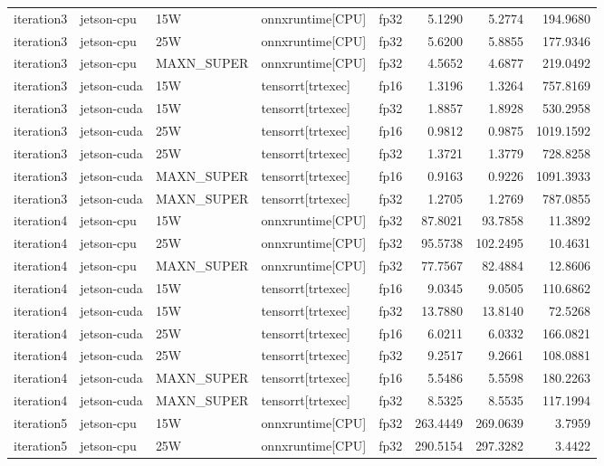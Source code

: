 \begin{table}
\begin{tabular}{lllllrrr}
iteration3 & jetson-cpu & 15W & onnxruntime[CPU] & fp32 & 5.1290 & 5.2774 & 194.9680 \\
iteration3 & jetson-cpu & 25W & onnxruntime[CPU] & fp32 & 5.6200 & 5.8855 & 177.9346 \\
iteration3 & jetson-cpu & MAXN\_SUPER & onnxruntime[CPU] & fp32 & 4.5652 & 4.6877 & 219.0492 \\
iteration3 & jetson-cuda & 15W & tensorrt[trtexec] & fp16 & 1.3196 & 1.3264 & 757.8169 \\
iteration3 & jetson-cuda & 15W & tensorrt[trtexec] & fp32 & 1.8857 & 1.8928 & 530.2958 \\
iteration3 & jetson-cuda & 25W & tensorrt[trtexec] & fp16 & 0.9812 & 0.9875 & 1019.1592 \\
iteration3 & jetson-cuda & 25W & tensorrt[trtexec] & fp32 & 1.3721 & 1.3779 & 728.8258 \\
iteration3 & jetson-cuda & MAXN\_SUPER & tensorrt[trtexec] & fp16 & 0.9163 & 0.9226 & 1091.3933 \\
iteration3 & jetson-cuda & MAXN\_SUPER & tensorrt[trtexec] & fp32 & 1.2705 & 1.2769 & 787.0855 \\
iteration4 & jetson-cpu & 15W & onnxruntime[CPU] & fp32 & 87.8021 & 93.7858 & 11.3892 \\
iteration4 & jetson-cpu & 25W & onnxruntime[CPU] & fp32 & 95.5738 & 102.2495 & 10.4631 \\
iteration4 & jetson-cpu & MAXN\_SUPER & onnxruntime[CPU] & fp32 & 77.7567 & 82.4884 & 12.8606 \\
iteration4 & jetson-cuda & 15W & tensorrt[trtexec] & fp16 & 9.0345 & 9.0505 & 110.6862 \\
iteration4 & jetson-cuda & 15W & tensorrt[trtexec] & fp32 & 13.7880 & 13.8140 & 72.5268 \\
iteration4 & jetson-cuda & 25W & tensorrt[trtexec] & fp16 & 6.0211 & 6.0332 & 166.0821 \\
iteration4 & jetson-cuda & 25W & tensorrt[trtexec] & fp32 & 9.2517 & 9.2661 & 108.0881 \\
iteration4 & jetson-cuda & MAXN\_SUPER & tensorrt[trtexec] & fp16 & 5.5486 & 5.5598 & 180.2263 \\
iteration4 & jetson-cuda & MAXN\_SUPER & tensorrt[trtexec] & fp32 & 8.5325 & 8.5535 & 117.1994 \\
iteration5 & jetson-cpu & 15W & onnxruntime[CPU] & fp32 & 263.4449 & 269.0639 & 3.7959 \\
iteration5 & jetson-cpu & 25W & onnxruntime[CPU] & fp32 & 290.5154 & 297.3282 & 3.4422 \\

\end{tabular}
\end{table}

